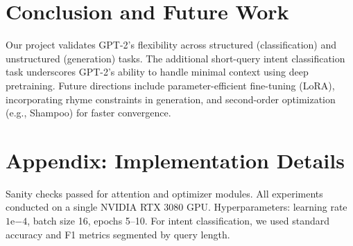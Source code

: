 \documentclass{article}
\begin{document}
\section{Conclusion and Future Work}
Our project validates GPT-2's flexibility across structured (classification) and unstructured (generation) tasks. The additional short-query intent classification task underscores GPT-2's ability to handle minimal context using deep pretraining. Future directions include parameter-efficient fine-tuning (LoRA), incorporating rhyme constraints in generation, and second-order optimization (e.g., Shampoo) for faster convergence.

\appendix
\section{Appendix: Implementation Details}
Sanity checks passed for attention and optimizer modules. All experiments conducted on a single NVIDIA RTX 3080 GPU. Hyperparameters: learning rate $1\mathrm{e}{-4}$, batch size 16, epochs 5--10. For intent classification, we used standard accuracy and F1 metrics segmented by query length.
\end{document}
